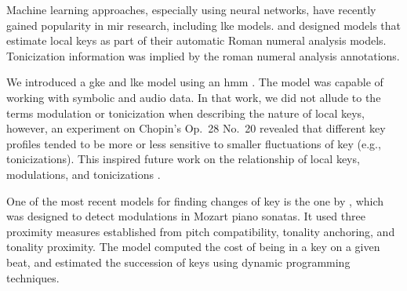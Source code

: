 Machine learning approaches, especially using neural
networks, have recently gained popularity in \gls{mir}
research, including \gls{lke} models.
\textcite{chen2018functional, chen2019harmony} and
\textcite{micchi2020not} designed models that estimate local
keys as part of their automatic Roman numeral analysis
models. Tonicization information was implied by the roman
numeral analysis annotations.

We introduced a \gls{gke} and \gls{lke} model using an
\gls{hmm} \textcite{napoleslopez2019keyfinding}. The model
was capable of working with symbolic and audio data. In that
work, we did not allude to the terms modulation or
tonicization when describing the nature of local keys,
however, an experiment on Chopin's Op.~28 No.~20 revealed
that different key profiles tended to be more or less
sensitive to smaller fluctuations of key (e.g.,
tonicizations). This inspired future work on the
relationship of local keys, modulations, and tonicizations
\parencite{napoleslopez2020local}.

One of the most recent models for finding changes of key is
the one by \textcite{feisthauer2020estimating}, which was
designed to detect modulations in Mozart piano sonatas. It
used three proximity measures established from pitch
compatibility, tonality anchoring, and tonality proximity.
The model computed the cost of being in a key on a given
beat, and estimated the succession of keys using dynamic
programming techniques.

